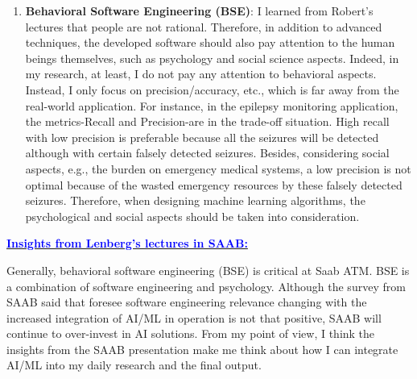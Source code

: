 \documentclass[11pt]{article}
\newcommand{\statement}[1]{\par\medskip
  \underline{\textcolor{blue}{\textbf{#1:}}}\space
}
\begin{document}
\begin{enumerate}
  \item \textbf{Behavioral Software Engineering (BSE)}: I learned from Robert's lectures that people are not rational. Therefore, in addition to advanced techniques, the developed software should also pay attention to the human beings themselves, such as psychology and social science aspects. Indeed, in my research, at least, I do not pay any attention to behavioral aspects. Instead, I only focus on precision/accuracy, etc., which is far away from the real-world application. For instance, in the epilepsy monitoring application, the metrics-Recall and Precision-are in the trade-off situation. High recall with low precision is preferable because all the seizures will be detected although with certain falsely detected seizures. Besides, considering social aspects, e.g., the burden on emergency medical systems, a low precision is not optimal because of the wasted emergency resources by these falsely detected seizures. Therefore, when designing machine learning algorithms, the psychological and social aspects should be taken into consideration.
\end{enumerate}

\statement{Insights from Lenberg's lectures in SAAB} 

Generally, behavioral software engineering (BSE) is critical at Saab ATM. BSE is a combination of software engineering and psychology. Although the survey from SAAB said that foresee software engineering relevance changing with the increased integration of AI/ML in operation is not that positive, SAAB will continue to over-invest in AI solutions. From my point of view, I think the insights from the SAAB presentation make me think about how I can integrate AI/ML into my daily research and the final output.
\end{document}
